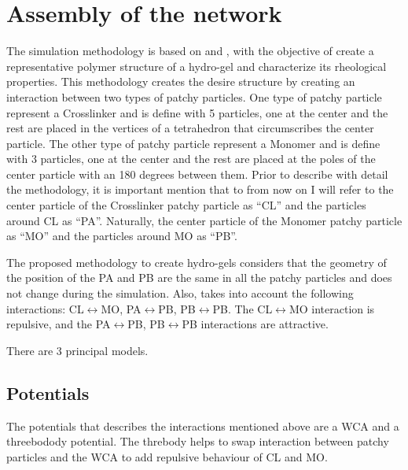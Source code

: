 \documentclass[main.tex]{subfiles}
\begin{document}
\section{Assembly of the network}\label{sec:descriptionSimulation}

The simulation methodology is based on \cite{gnanSilicoSynthesisMicrogel2017} and \cite{sorichettiStructureElasticityModel2023}, with the objective of create a representative polymer structure of a hydro-gel and characterize its rheological properties.
This methodology creates the desire structure by creating an interaction between two types of patchy particles.
One type of patchy particle represent a Crosslinker and is define with 5 particles, one at the center and the rest are placed in the vertices of a tetrahedron that circumscribes the center particle.
The other type of patchy particle represent a Monomer and is define with 3 particles, one at the center and the rest are placed at the poles of the center particle with an 180 degrees between them.
Prior to describe with detail the methodology, it is important mention that to from now on I will refer to the center particle of the Crosslinker patchy particle as ``CL'' and the particles around CL as ``PA''.
Naturally, the center particle of the Monomer patchy particle as ``MO'' and the particles around MO as ``PB''.

The proposed methodology to create hydro-gels considers that the geometry of the position of the PA and PB are the same in all the patchy particles and does not change during the simulation.
Also, takes into account the following interactions: CL$\longleftrightarrow$MO, PA$\longleftrightarrow$PB, PB$\longleftrightarrow$PB.
The CL$\longleftrightarrow$MO interaction is repulsive, and the PA$\longleftrightarrow$PB, PB$\longleftrightarrow$PB interactions are attractive.

There are 3 principal models.



\subsection{Potentials}\label{subsec:Potentials}

The potentials that describes the interactions mentioned above are a WCA and a threebodody potential.
The threbody helps to swap interaction between patchy particles and the WCA to add repulsive behaviour of CL and MO.
\end{document}
